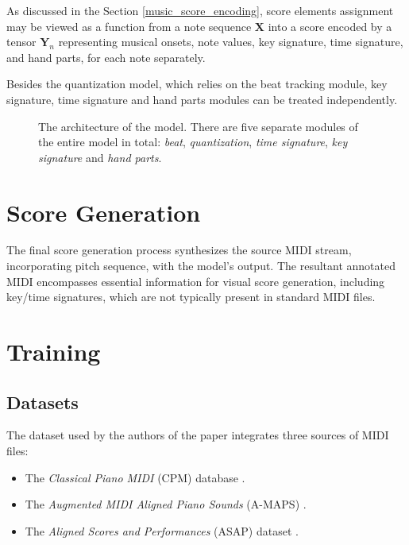As discussed in the Section \ref{music_score_encoding}, score elements assignment may be viewed as a function from a note sequence $\mathbf{X}$ into a score encoded by a tensor $\mathbf{Y}_n$ representing musical onsets, note values, key signature, time signature, and hand parts, for each note separately.

Besides the quantization model, which relies on the beat tracking module, key signature, time signature and hand parts modules can be treated independently.

\begin{figure}[!ht]
\centering

\caption[The architecture of the model.]{The architecture of the model. There are five separate modules of the entire model in total: \emph{beat}, \emph{quantization}, \emph{time signature}, \emph{key signature} and \emph{hand parts}.}
\end{figure}

\section{Score Generation}

The final score generation process synthesizes the source MIDI stream, incorporating pitch sequence, with the model's output. The resultant annotated MIDI encompasses essential information for visual score generation, including key/time signatures, which are not typically present in standard MIDI files.

\missing

\section{Training}

\subsection{Datasets}

The dataset used by the authors of the paper \cite{Liu2022} integrates three sources of MIDI files: \begin{itemize}
	\item The \emph{Classical Piano MIDI} (CPM) database \cite{Krueger1996}.
	\item The \emph{Augmented MIDI Aligned Piano Sounds} (A-MAPS) \cite{Ycart2018}.
	\item The \emph{Aligned Scores and Performances} (ASAP) dataset \cite{Foscarin2020}.
\end{itemize}

